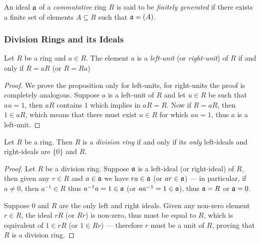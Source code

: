 \begin{definition}
    \label{def:finitely-generated-ideal}
    An ideal \(\mathfrak{a}\) of a \emph{commutative} ring \(R\) is said to be
    \emph{finitely generated} if there exists a finite set of elements
    \(A \subseteq R\) such that \(\mathfrak{a} = (A)\).
\end{definition}

\subsubsection{Division Rings and its Ideals}

\begin{proposition}
    \label{prop:unit-iff-R=aR}
    Let \(R\) be a ring and \(a \in R\). The element \(a\) is a \emph{left-unit} (or
    \emph{right-unit}) of \(R\) if and only if \(R = a R\) (or \(R = R a\))
\end{proposition}

\begin{proof}
    We prove the proposition only for left-units, for right-units the proof is
    completely analogous. Suppose \(a\) is a left-unit of \(R\) and let \(u \in R\)
    be such that \(a u = 1\), then \(aR\) contains \(1\) which implies in \(a R =
    R\). Now if \(R = a R\), then \(1 \in a R\), which means that there must exist
    \(u \in R\) for which \(a u = 1\), thus \(a\) is a left-unit.
\end{proof}

\begin{proposition}
    \label{prop:division-ring-ideals-are-0-or-ring}
    Let \(R\) be a ring. Then \(R\) is a \emph{division ring} if and only if its
    \emph{only} left-ideals and right-ideals are \(\{0\}\) and \(R\).
\end{proposition}

\begin{proof}
    Let \(R\) be a division ring. Suppose \(\mathfrak{a}\) is a left-ideal (or
    right-ideal) of \(R\), then given any \(r \in R\) and \(a \in \mathfrak{a}\) we
    have \(r a \in \mathfrak{a}\) (or \(a r \in \mathfrak{a}\)) --- in particular, if
    \(a \neq 0\), then \(a^{-1} \in R\) thus \(a^{-1} a = 1 \in \mathfrak{a}\) (or
    \(a a^{-1} = 1 \in \mathfrak{a}\)), thus \(\mathfrak{a} = R\) or \(\mathfrak{a} = 0\).

    Suppose \(0\) and \(R\) are the only left and right ideals. Given any non-zero
    element \(r \in R\), the ideal \(r R\) (or \(R r\)) is non-zero, thus must be
    equal to \(R\), which is equivalent of \(1 \in r R\) (or \(1 \in R r\)) ---
    therefore \(r\) must be a unit of \(R\), proving that \(R\) is a division ring.
\end{proof}

